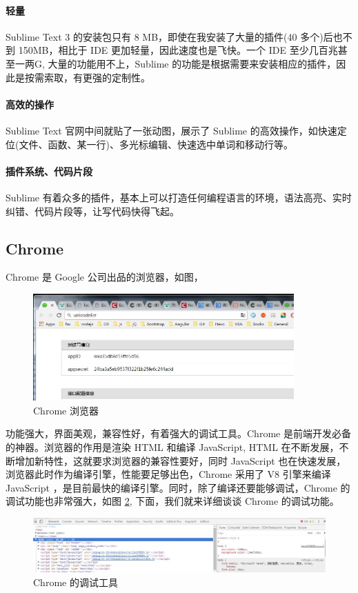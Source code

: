 \documentclass[UTF8]{ctexbook}
\begin{document}
{{            \paragraph{轻量} Sublime Text 3 的安装包只有 8 MB，即使在我安装了大量的插件(40 多个)后也不到 150MB，相比于 IDE 更加轻量，因此速度也是飞快。一个 IDE 至少几百兆甚至一两G, 大量的功能用不上，Sublime 的功能是根据需要来安装相应的插件，因此是按需索取，有更强的定制性。

            \paragraph{高效的操作} Sublime Text 官网中间就贴了一张动图，展示了 Sublime 的高效操作，如快速定位(文件、函数、某一行)、多光标编辑、快速选中单词和移动行等。

            \paragraph{插件系统、代码片段} Sublime 有着众多的插件，基本上可以打造任何编程语言的环境，语法高亮、实时纠错、代码片段等，让写代码快得飞起。

        \subsection{Chrome}
          \label{subsec:chrome}
            Chrome 是 Google 公司出品的浏览器，如图，
            \begin{figure}[H]
              \centering
              \includegraphics[width=10cm]{./img/chrome.jpg}
              \caption{Chrome 浏览器}
              \label{fig:chrome}
            \end{figure}
            功能强大，界面美观，兼容性好，有着强大的调试工具。Chrome 是前端开发必备的神器。浏览器的作用是渲染 HTML 和编译 JavaScript, HTML 在不断发展，不断增加新特性，这就要求浏览器的兼容性要好，同时 JavaScript 也在快速发展，浏览器此时作为编译引擎，性能要足够出色，Chrome 采用了 V8 引擎来编译 JavaScript ，是目前最快的编译引擎。同时，除了编译还要能够调试，Chrome 的调试功能也非常强大，如图 \ref{fig:chrome_debug}, 下面，我们就来详细谈谈 Chrome 的调试功能。
            \begin{figure}[H]
              \centering
              \includegraphics[width=12cm]{./img/chrome_debug.jpg}
              \caption{Chrome 的调试工具}
              \label{fig:chrome_debug}
            \end{figure}

}}
\end{document}
